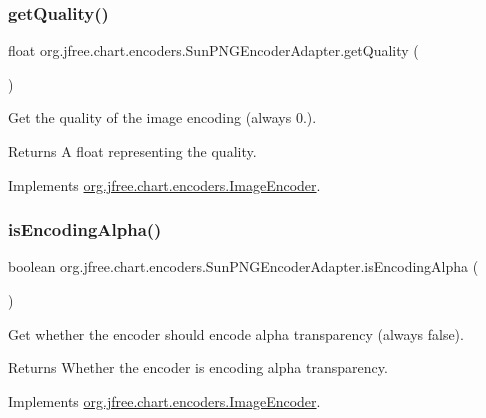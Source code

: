 \subsubsection{\texorpdfstring{get\+Quality()}{getQuality()}}
{\footnotesize\ttfamily float org.\+jfree.\+chart.\+encoders.\+Sun\+P\+N\+G\+Encoder\+Adapter.\+get\+Quality (\begin{DoxyParamCaption}{ }\end{DoxyParamCaption})}

Get the quality of the image encoding (always 0.).

\begin{DoxyReturn}{Returns}
A float representing the quality. 
\end{DoxyReturn}


Implements \mbox{\hyperlink{interfaceorg_1_1jfree_1_1chart_1_1encoders_1_1_image_encoder_a292037d46187ca04bbd3a9362bf6ad22}{org.\+jfree.\+chart.\+encoders.\+Image\+Encoder}}.

\mbox{\label{classorg_1_1jfree_1_1chart_1_1encoders_1_1_sun_p_n_g_encoder_adapter_adc379d171449112333184b52e7292df8}} 
\subsubsection{\texorpdfstring{is\+Encoding\+Alpha()}{isEncodingAlpha()}}
{\footnotesize\ttfamily boolean org.\+jfree.\+chart.\+encoders.\+Sun\+P\+N\+G\+Encoder\+Adapter.\+is\+Encoding\+Alpha (\begin{DoxyParamCaption}{ }\end{DoxyParamCaption})}

Get whether the encoder should encode alpha transparency (always false).

\begin{DoxyReturn}{Returns}
Whether the encoder is encoding alpha transparency. 
\end{DoxyReturn}


Implements \mbox{\hyperlink{interfaceorg_1_1jfree_1_1chart_1_1encoders_1_1_image_encoder_afd771eda4e4d50113696e241f5a34f2c}{org.\+jfree.\+chart.\+encoders.\+Image\+Encoder}}.

